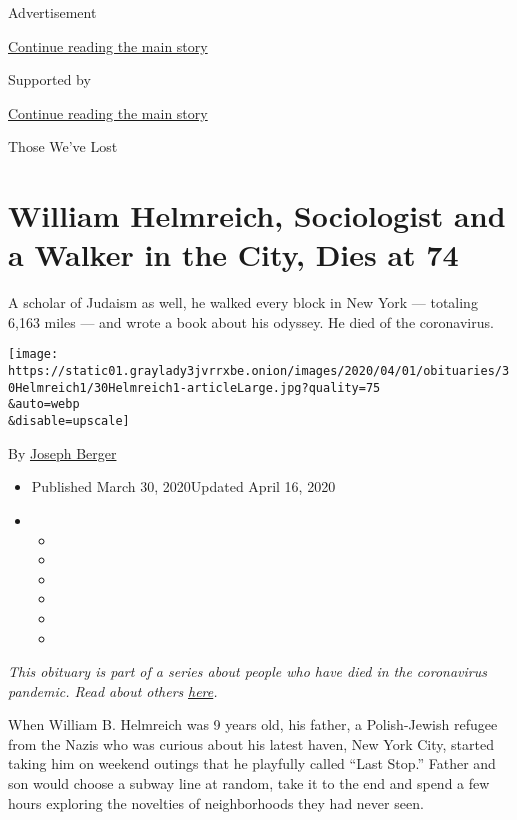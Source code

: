 Advertisement

\protect\hyperlink{after-top}{Continue reading the main story}

Supported by

\protect\hyperlink{after-sponsor}{Continue reading the main story}

Those We've Lost

\hypertarget{william-helmreich-sociologist-and-a-walker-in-the-city-dies-at-74}{%
\section{William Helmreich, Sociologist and a Walker in the City, Dies
at
74}\label{william-helmreich-sociologist-and-a-walker-in-the-city-dies-at-74}}

A scholar of Judaism as well, he walked every block in New York ---
totaling 6,163 miles --- and wrote a book about his odyssey. He died of
the coronavirus.

\texttt{[image: https://static01.graylady3jvrrxbe.onion/images/2020/04/01/obituaries/30Helmreich1/30Helmreich1-articleLarge.jpg?quality=75\\\&auto=webp\\\&disable=upscale]}

By \href{https://www.nytimes3xbfgragh.onion/by/joseph-berger}{Joseph
Berger}

\begin{itemize}
\item
  Published March 30, 2020Updated April 16, 2020
\item
  \begin{itemize}
  \item
  \item
  \item
  \item
  \item
  \item
  \end{itemize}
\end{itemize}

\emph{This obituary is part of a series about people who have died in
the coronavirus pandemic. Read about others}
\href{https://www.nytimes3xbfgragh.onion/series/people-who-have-died-of-the-coronavirus}{\emph{here}}\emph{.}

When William B. Helmreich was 9 years old, his father, a Polish-Jewish
refugee from the Nazis who was curious about his latest haven, New York
City, started taking him on weekend outings that he playfully called
``Last Stop.'' Father and son would choose a subway line at random, take
it to the end and spend a few hours exploring the novelties of
neighborhoods they had never seen.


